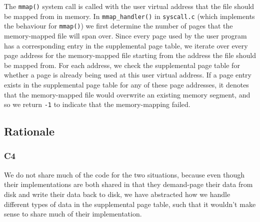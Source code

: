 \documentclass[a4wide, 11pt]{article}
\newcommand{\tx}{\texttt}
\begin{document}
The \tx{mmap()} system call is called with the user virtual address that the file should be mapped from in memory. In \tx{mmap\_handler()} in \tx{syscall.c} (which implements the behaviour for \tx{mmap()}) we first determine the number of pages that the memory-mapped file will span over. Since every page used by the user program has a corresponding entry in the supplemental page table, we iterate over every page address for the memory-mapped file starting from the address the file should be mapped from. For each address, we check the supplemental page table for whether a page is already being used at this user virtual address. If a page entry exists in the supplemental page table for any of these page addresses, it denotes that the memory-mapped file would overwrite an existing memory segment, and so we return \tx{-1} to indicate that the memory-mapping failed.

\subsection{Rationale}
\subsubsection{C4}

We do not share much of the code for the two situations, because even though their implementations are both shared in that they demand-page their data from disk and write their data back to disk, we have abstracted how we handle different types of data in the supplemental page table, such that it wouldn't make sense to share much of their implementation.
\end{document}
